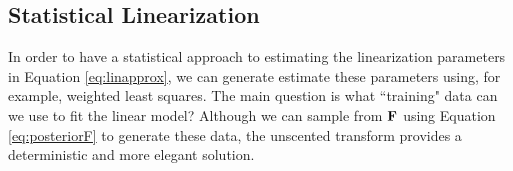 \subsection{Statistical Linearization}
In order to have a  statistical approach to estimating the linearization parameters 
 in  Equation \eqref{eq:linapprox}, we can generate estimate these parameters
 using, for example, weighted least squares.  The main question 
is what ``training" data  can we use to fit the linear model? Although we can 
sample from $\mathbf{F}$ using Equation \eqref{eq:posteriorF} to generate these data, 
the unscented transform  provides a deterministic and more elegant solution. 









































